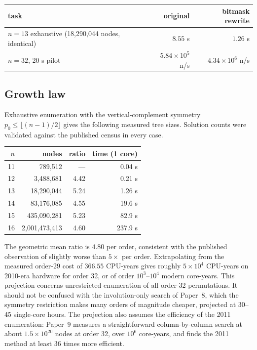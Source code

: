 \documentclass[11pt,a4paper,oneside]{report}
\theoremstyle{definition}
\begin{document}
\begin{center}
\begin{tabular}{@{}lrr@{}}
\toprule
task & original & bitmask rewrite \\
\midrule
$n=13$ exhaustive (18{,}290{,}044 nodes, identical) & $8.55$ s & $1.26$ s \\
$n=32$, 20 s pilot & $5.84\times10^5$ n/s & $4.34\times10^6$ n/s \\
\bottomrule
\end{tabular}
\end{center}

\subsection{Growth law}

Exhaustive enumeration with the vertical-complement symmetry $p_0\le
\lfloor(n-1)/2\rfloor$ gives the following measured tree sizes. Solution counts
were validated against the published census in every case.

\begin{center}
\begin{tabular}{@{}rrrr@{}}
\toprule
$n$ & nodes & ratio & time (1 core) \\
\midrule
11 & 789{,}512 & --- & 0.04 s\\
12 & 3{,}488{,}681 & 4.42 & 0.21 s\\
13 & 18{,}290{,}044 & 5.24 & 1.26 s\\
14 & 83{,}176{,}085 & 4.55 & 19.6 s\\
15 & 435{,}090{,}281 & 5.23 & 82.9 s\\
16 & 2{,}001{,}473{,}413 & 4.60 & 237.9 s\\
\bottomrule
\end{tabular}
\end{center}

The geometric mean ratio is $\mathbf{4.80}$ per order, consistent with the
published observation of slightly worse than $5\times$ per order. Extrapolating
from the measured order-29 cost of $366.55$ CPU-years gives roughly
$5\times10^4$ CPU-years on 2010-era hardware for order 32, or of order $10^3$--$10^4$ modern core-years. This projection concerns unrestricted enumeration of all
order-32 permutations. It should not be confused with the involution-only search of Paper~8, which
the symmetry restriction makes many orders of magnitude cheaper, projected at 30--45 single-core hours. The projection also assumes the efficiency of the 2011 enumeration: Paper~9
measures a straightforward column-by-column search at about $1.5\times10^{20}$ nodes at order 32, over
$10^6$ core-years, and finds the 2011 method at least 36 times more efficient.
\end{document}
